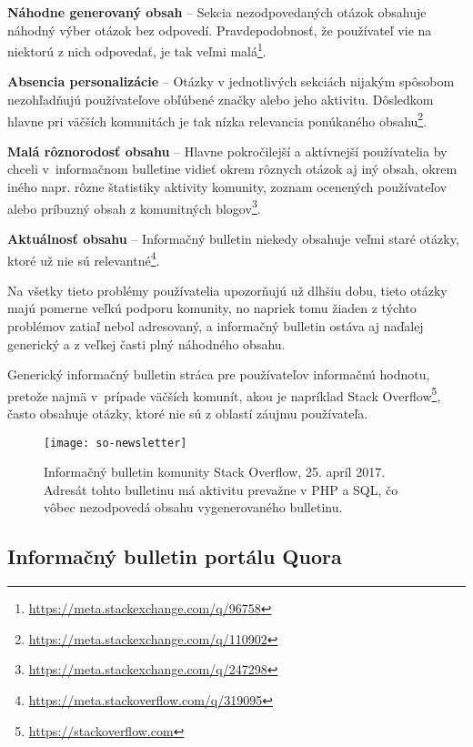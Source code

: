 \begin{my_itemize}
  \item{\textbf{Náhodne generovaný obsah} -- Sekcia nezodpovedaných otázok obsahuje náhodný výber otázok bez odpovedí.
        Pravdepodobnosť, že používateľ vie na niektorú z nich odpovedať, je tak veľmi
        malá\footnote{\url{https://meta.stackexchange.com/q/96758}}.}
  \item{\textbf{Absencia personalizácie} -- Otázky v jednotlivých sekciách nijakým spôsobom nezohľadňujú používateľove
        obľúbené značky alebo jeho aktivitu. Dôsledkom hlavne pri väčších komunitách je tak nízka relevancia ponúkaného
        obsahu\footnote{\url{https://meta.stackexchange.com/q/110902}}.}
  \item{\textbf{Malá rôznorodosť obsahu} -- Hlavne pokročilejší a aktívnejší používatelia by chceli v~informačnom bulletine vidieť
        okrem rôznych otázok aj iný obsah, okrem iného napr. rôzne štatistiky aktivity komunity, zoznam ocenených používateľov
        alebo príbuzný obsah z komunitných blogov\footnote{\url{https://meta.stackexchange.com/q/247298}}.}
  \item{\textbf{Aktuálnosť obsahu} -- Informačný bulletin niekedy obsahuje veľmi staré otázky, ktoré už nie sú
  relevantné\footnote{\url{https://meta.stackoverflow.com/q/319095}}.}
\end{my_itemize}

Na všetky tieto problémy používatelia upozorňujú už dlhšiu dobu, tieto otázky majú pomerne veľkú podporu komunity,
no napriek tomu žiaden z týchto problémov zatiaľ nebol adresovaný, a informačný bulletin ostáva aj naďalej generický
a z veľkej časti plný náhodného obsahu.

Generický informačný bulletin stráca pre používateľov informačnú hodnotu, pretože
najmä v~prípade väčších komunít, akou je napríklad Stack Overflow\footnote{\url{https://stackoverflow.com}}, často obsahuje
otázky, ktoré nie sú z oblastí záujmu používateľa.


\begin{figure}[H]\begin{center}
\texttt{[image: so-newsletter]}
\caption{Informačný bulletin komunity Stack Overflow, 25. apríl 2017. Adresát tohto bulletinu má aktivitu prevažne v
PHP a SQL, čo vôbec nezodpovedá obsahu vygenerovaného bulletinu. \label{fig:so-newsletter}}\end{center}
\end{figure}

\subsection{Informačný bulletin portálu Quora}

